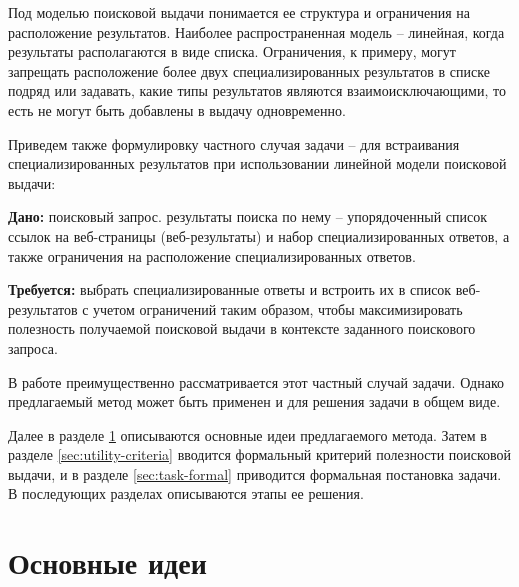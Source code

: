 \documentclass[12pt,a4paper]{report}
\newcommand\note[1]{\textcolor{red}{(#1)}}
\newcommand\todonote[1]{\note{TODO: #1}}
\begin{document}
\noindent Под моделью поисковой выдачи понимается ее структура и ограничения на расположение результатов. Наиболее распространенная модель -- линейная, когда результаты располагаются в виде списка. Ограничения, к примеру, могут запрещать расположение более двух специализированных результатов в списке подряд или задавать, какие типы результатов являются взаимоисключающими, то есть не могут быть добавлены в выдачу одновременно.

Приведем также формулировку частного случая задачи -- для встраивания специализированных результатов при использовании линейной модели поисковой выдачи:

\vspace{3mm}
\textbf{Дано:} поисковый запрос. результаты поиска по нему -- упорядоченный список ссылок на веб-страницы (веб-результаты) и набор специализированных ответов, а также ограничения на расположение специализированных ответов. 

\textbf{Требуется:} выбрать специализированные ответы и встроить их в список веб-результатов с учетом ограничений таким образом, чтобы максимизировать полезность получаемой поисковой выдачи в контексте заданного поискового запроса.
\vspace{3mm}

\noindent В работе преимущественно рассматривается этот частный случай задачи. Однако предлагаемый метод может быть применен и для решения задачи в общем виде.

Далее в разделе \ref{sec:base-ideas} описываются основные идеи предлагаемого метода. Затем в разделе \ref{sec:utility-criteria} вводится формальный критерий полезности поисковой выдачи, и в разделе \ref{sec:task-formal} приводится формальная постановка задачи. В последующих разделах описываются этапы ее решения.


\section{Основные идеи}
\label{sec:base-ideas}
\end{document}
